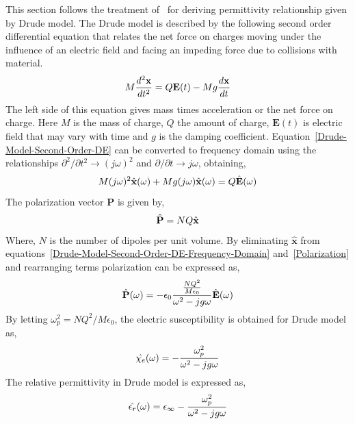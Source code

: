 This section follows the treatment of~\cite[Ch. 10, 289--290]{JBSchneiderUFDTD} for deriving permittivity relationship given by Drude model. The Drude model is described by the following second order differential equation that relates the net force on charges moving under the influence of an electric field and facing an impeding force due to collisions with material.
\begin{equation}
\centering
M\dfrac{d^2 \textbf{x}}{dt^2} = Q \textbf{E}(t) - Mg\dfrac{d \textbf{x}}{dt}
\label{Drude-Model-Second-Order-DE}
\end{equation}
The left side of this equation gives mass times acceleration or the net force on charge. Here $M$ is the mass of charge, $Q$ the amount of charge, $\textbf{E}(t)$ is electric field that may vary with time and $g$ is the damping coefficient. Equation~\ref{Drude-Model-Second-Order-DE} can be converted to frequency domain using the relationships $\partial ^2/\partial t^2 \rightarrow (j\omega)^2$ and $\partial/\partial t \rightarrow j\omega$, obtaining,
\begin{equation}
\centering
M(j\omega)^2\hat{\textbf{x}}(\omega)+Mg(j\omega)\hat{\textbf{x}}(\omega)=Q\hat{\textbf{E}}(\omega)
\label{Drude-Model-Second-Order-DE-Frequency-Domain}
\end{equation}
The polarization vector $\textbf{P}$ is given by,
\begin{equation}
\centering
\hat{\textbf{P}}=NQ\hat{\textbf{x}}
\label{Polarization}
\end{equation}
Where, $N$ is the number of dipoles per unit volume. By eliminating $\hat{\textbf{x}}$ from equations~\ref{Drude-Model-Second-Order-DE-Frequency-Domain} and~\ref{Polarization} and rearranging terms polarization can be expressed as,
\begin{equation}
\centering
\hat{\textbf{P}}(\omega)=-\epsilon_0\dfrac{\frac{NQ^2}{M\epsilon_0}}{\omega^2-jg\omega}\hat{\textbf{E}}(\omega)
\label{Polarization-Frequency-Domain}
\end{equation}
By letting $\omega^2_p=NQ^2/M\epsilon_0$, the electric susceptibility is obtained for Drude model as,
\begin{equation}
\centering
\hat{\chi_e}(\omega)=-\dfrac{\omega^2_p}{\omega^2-jg\omega}
\label{Electric-Susceptibility-Drude}
\end{equation}
The relative permittivity in Drude model is expressed as,
\begin{equation}
\centering
\hat{\epsilon_r}(\omega)=\epsilon_\infty-\dfrac{\omega^2_p}{\omega^2-jg\omega}
\label{er-Drude}
\end{equation}
